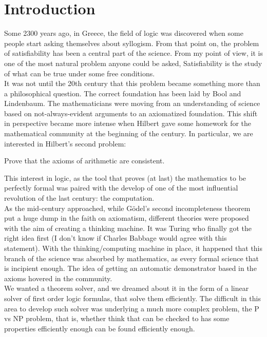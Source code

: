 
\chapter{Introduction}
Some 2300 years ago, in Greece,  the field of logic was discovered when some people start asking themselves about syllogism. From that point on, the problem of satisfiability has been a central part of the science.  From my point of view, it is one of the most natural problem anyone could be asked,  Satisfiability is the study of what can be true under some free conditions.\\

It was not until the 20th century that this problem became something more than a philosophical question. The correct foundation has been laid by Bool and Lindenbaum. The mathematicians were moving from an understanding of science based on not-always-evident arguments to an axiomatized foundation. This shift in perspective became more intense when Hilbert gave some homework for the mathematical community at the beginning of the century. In particular, we are interested in Hilbert's second problem:


\begin{quoting}
Prove that the axioms of arithmetic are consistent. 
\end{quoting}

This interest in logic, as the tool that proves (at last) the mathematics to be perfectly formal was paired with the develop of one of the most influential revolution of the last century: the computation.\\

As the mid-century approached, while Gödel's second incompleteness theorem put a huge dump in the faith on axiomatism,  different theories were proposed with the aim of creating a thinking machine. It was Turing who finally got the right idea first (I don't know if Charles Babbage would agree with this statement). With the thinking/computing machine in place, it happened that this branch of the science was absorbed by mathematics, as every formal science that is incipient enough.  The idea of getting an automatic demonstrator based in the axioms hovered in the community.\\


We wanted a theorem solver, and we dreamed about it in the form of a linear solver of first order logic formulas, that solve them efficiently. The difficult in this area to develop such solver was underlying a much more complex problem, the P vs NP problem, that is, whether think that can be checked to has some properties efficiently enough can be found efficiently enough.\\

